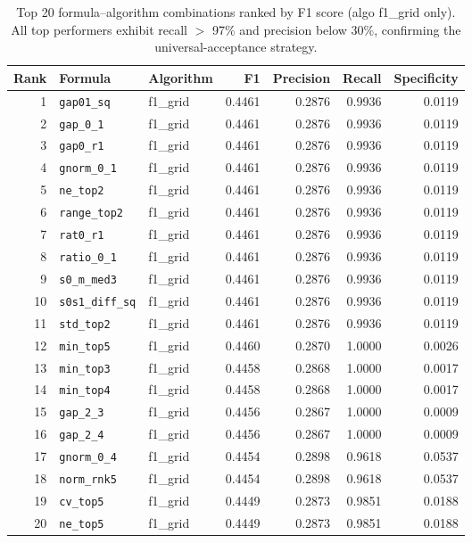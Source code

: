 \documentclass[11pt,a4paper]{article}
\newcommand{\formula}[1]{\texttt{#1}}
\newcommand{\algo}[1]{\textsf{#1}}
\begin{document}
\begin{table}[htbp]
\centering
\caption{Top 20 formula--algorithm combinations ranked by F1 score (algo \algo{f1\_grid} only). All top performers exhibit recall $>$ 97\% and precision below 30\%, confirming the universal-acceptance strategy.}
\label{tab:top20}
\small
\begin{tabular}{@{}rllrrrr@{}}
\toprule
\textbf{Rank} & \textbf{Formula} & \textbf{Algorithm} & \textbf{F1} & \textbf{Precision} & \textbf{Recall} & \textbf{Specificity} \\
\midrule
 1 & \formula{gap01\_sq} & f1\_grid & 0.4461 & 0.2876 & 0.9936 & 0.0119 \\
 2 & \formula{gap\_0\_1} & f1\_grid & 0.4461 & 0.2876 & 0.9936 & 0.0119 \\
 3 & \formula{gap0\_r1} & f1\_grid & 0.4461 & 0.2876 & 0.9936 & 0.0119 \\
 4 & \formula{gnorm\_0\_1} & f1\_grid & 0.4461 & 0.2876 & 0.9936 & 0.0119 \\
 5 & \formula{ne\_top2} & f1\_grid & 0.4461 & 0.2876 & 0.9936 & 0.0119 \\
 6 & \formula{range\_top2} & f1\_grid & 0.4461 & 0.2876 & 0.9936 & 0.0119 \\
 7 & \formula{rat0\_r1} & f1\_grid & 0.4461 & 0.2876 & 0.9936 & 0.0119 \\
 8 & \formula{ratio\_0\_1} & f1\_grid & 0.4461 & 0.2876 & 0.9936 & 0.0119 \\
 9 & \formula{s0\_m\_med3} & f1\_grid & 0.4461 & 0.2876 & 0.9936 & 0.0119 \\
10 & \formula{s0s1\_diff\_sq} & f1\_grid & 0.4461 & 0.2876 & 0.9936 & 0.0119 \\
11 & \formula{std\_top2} & f1\_grid & 0.4461 & 0.2876 & 0.9936 & 0.0119 \\
12 & \formula{min\_top5} & f1\_grid & 0.4460 & 0.2870 & 1.0000 & 0.0026 \\
13 & \formula{min\_top3} & f1\_grid & 0.4458 & 0.2868 & 1.0000 & 0.0017 \\
14 & \formula{min\_top4} & f1\_grid & 0.4458 & 0.2868 & 1.0000 & 0.0017 \\
15 & \formula{gap\_2\_3} & f1\_grid & 0.4456 & 0.2867 & 1.0000 & 0.0009 \\
16 & \formula{gap\_2\_4} & f1\_grid & 0.4456 & 0.2867 & 1.0000 & 0.0009 \\
17 & \formula{gnorm\_0\_4} & f1\_grid & 0.4454 & 0.2898 & 0.9618 & 0.0537 \\
18 & \formula{norm\_rnk5} & f1\_grid & 0.4454 & 0.2898 & 0.9618 & 0.0537 \\
19 & \formula{cv\_top5} & f1\_grid & 0.4449 & 0.2873 & 0.9851 & 0.0188 \\
20 & \formula{ne\_top5} & f1\_grid & 0.4449 & 0.2873 & 0.9851 & 0.0188 \\
\bottomrule
\end{tabular}
\end{table}
\end{document}
